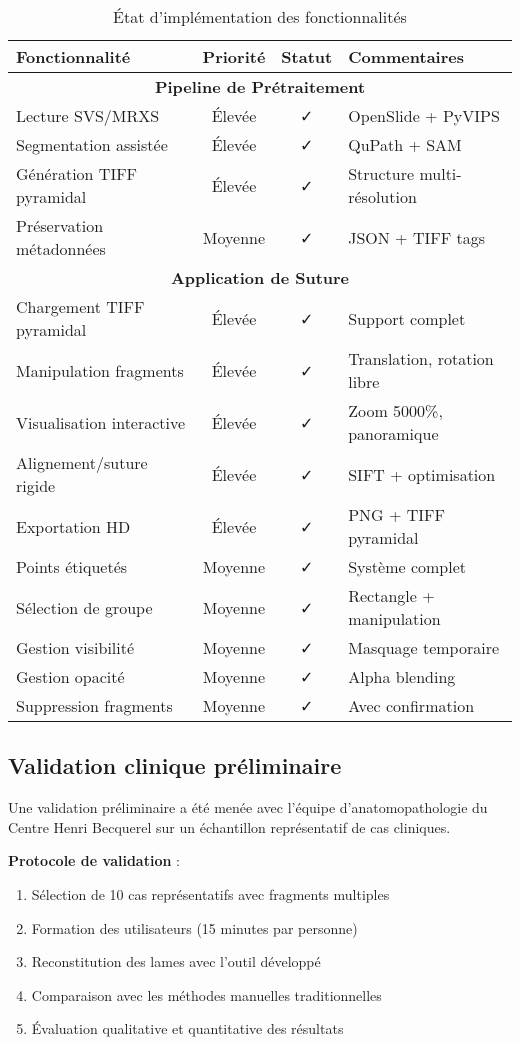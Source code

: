 \documentclass[12pt,a4paper]{report}
\begin{document}
\begin{table}[H]
\centering
\caption{État d'implémentation des fonctionnalités}
\label{tab:fonctionnalites}
\begin{tabular}{|l|c|c|l|}
\hline
\textbf{Fonctionnalité} & \textbf{Priorité} & \textbf{Statut} & \textbf{Commentaires} \\
\hline
\multicolumn{4}{|c|}{\textbf{Pipeline de Prétraitement}} \\
\hline
Lecture SVS/MRXS & Élevée & ✓ & OpenSlide + PyVIPS \\
Segmentation assistée & Élevée & ✓ & QuPath + SAM \\
Génération TIFF pyramidal & Élevée & ✓ & Structure multi-résolution \\
Préservation métadonnées & Moyenne & ✓ & JSON + TIFF tags \\
\hline
\multicolumn{4}{|c|}{\textbf{Application de Suture}} \\
\hline
Chargement TIFF pyramidal & Élevée & ✓ & Support complet \\
Manipulation fragments & Élevée & ✓ & Translation, rotation libre \\
Visualisation interactive & Élevée & ✓ & Zoom 5000\%, panoramique \\
Alignement/suture rigide & Élevée & ✓ & SIFT + optimisation \\
Exportation HD & Élevée & ✓ & PNG + TIFF pyramidal \\
Points étiquetés & Moyenne & ✓ & Système complet \\
Sélection de groupe & Moyenne & ✓ & Rectangle + manipulation \\
Gestion visibilité & Moyenne & ✓ & Masquage temporaire \\
Gestion opacité & Moyenne & ✓ & Alpha blending \\
Suppression fragments & Moyenne & ✓ & Avec confirmation \\
\hline
\end{tabular}
\end{table}

\subsection{Validation clinique préliminaire}

Une validation préliminaire a été menée avec l'équipe d'anatomopathologie du Centre Henri Becquerel sur un échantillon représentatif de cas cliniques.

\textbf{Protocole de validation} :
\begin{enumerate}
\item Sélection de 10 cas représentatifs avec fragments multiples
\item Formation des utilisateurs (15 minutes par personne)
\item Reconstitution des lames avec l'outil développé
\item Comparaison avec les méthodes manuelles traditionnelles
\item Évaluation qualitative et quantitative des résultats
\end{enumerate}
\end{document}
